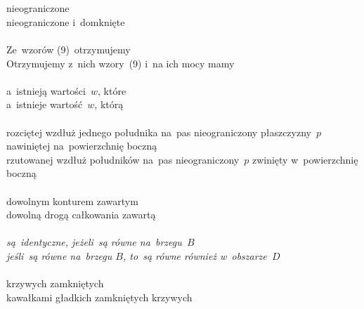 \documentclass[a4paper,11pt]{article}
\begin{document}
\noi \\
 \\
\Jest nieograniczone \\
\Pow  nieograniczone i~domknięte \\
 \\
\Jest Ze~wzorów (9)~otrzymujemy \\
\Pow  Otrzymujemy z~nich wzory~(9) i~na ich mocy mamy \\
 \\
\Jest a~istnieją wartości~$w$, które \\
\Pow  a~istnieje wartość~$w$, którą \\
 \\
\Jest rozciętej wzdłuż jednego południka na~pas nieograniczony
płaszczyzny~$p$ nawiniętej na~powierzchnię boczną \\
\Pow rzutowanej wzdłuż południków na~pas nieograniczony~$p$ zwinięty
w~powierzchnię boczną \\
 \\
\Jest dowolnym konturem zawartym \\
\Pow  dowolną drogą całkowania zawartą \\
 \\
\Jest \emph{są~identyczne, jeżeli~są równe na~brzegu~$B$} \\
\Pow \emph{jeśli~są równe na~brzegu $B$, to~są równe również
  w~obszarze~$D$} \\
 \\
\Jest krzywych zamkniętych \\
\Pow  kawałkami gładkich zamkniętych krzywych \\

\vspace{\spaceTwo}














 {}




\end{document}
